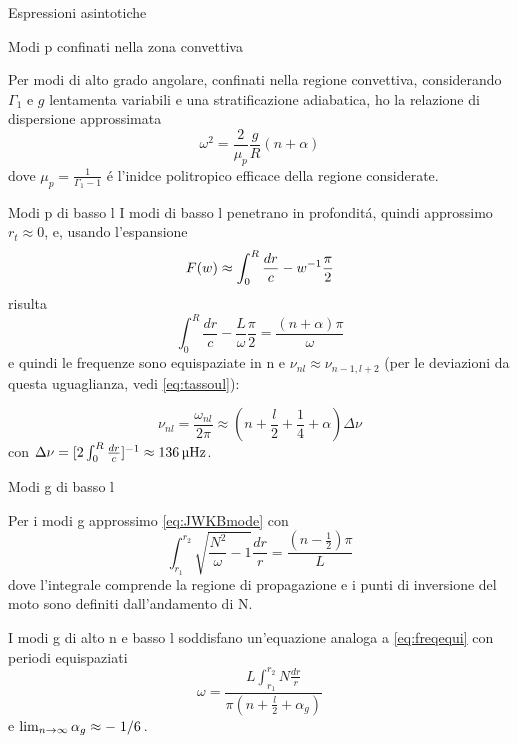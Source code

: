 \begin{frame}{Espressioni asintotiche}

\begin{block}{Modi p confinati nella zona convettiva}

Per modi di alto grado angolare, confinati nella regione convettiva, considerando $\Gamma_1$ e $g$ lentamenta variabili e una stratificazione adiabatica, ho la relazione di dispersione approssimata
\begin{equation}
\omega^2=\frac{2}{\mu_p}\frac{g}{R}(n+\alpha)
\end{equation}
dove $\mu_p=\frac{1}{\Gamma_1-1}$ \'e l'inidce politropico efficace della regione considerate.

\end{block}

\begin{block}{Modi p di basso l}
I modi di basso l penetrano in profondit\'a, quindi approssimo $r_t\approx0$, e, usando l'espansione
\begin{equation}
F(w)\approx\int_0^R\frac{dr}{c}-w^{-1}\frac{\pi}{2}\label{eq:Flinear}
\end{equation}
 risulta
\begin{equation}
\int_0^R\frac{dr}{c}-\frac{L}{\omega}\frac{\pi}{2}=\frac{(n+\alpha)\pi}{\omega}
\end{equation}
e quindi le  frequenze sono equispaziate in n e $\nu_{nl}\approx\nu_{n-1,l+2}$ (per le deviazioni da questa uguaglianza, vedi \eqref{eq:tassoul}):

\begin{equation}
\nu_{nl}=\frac{\omega_{nl}}{2\pi}\approx(n+\frac{l}{2}+\frac{1}{4}+\alpha)\Delta\nu\label{eq:freqequi}
\end{equation}
con $\Delta\nu=[2\int_0^R\frac{dr}{c}]^{-1}\approx\SI{136}{\micro\hertz}$.

\end{block}

\begin{block}{Modi g di basso l}

Per i modi g approssimo \eqref{eq:JWKBmode} con
\begin{equation}
\int_{r_1}^{r_2}\sqrt{\frac{N^2}{\omega}-1}\frac{dr}{r}=\frac{(n-\frac{1}{2})\pi}{L}
\end{equation}
dove l'integrale comprende la regione di propagazione e i punti di inversione del moto sono definiti dall'andamento di N.

I modi g di alto n e basso l soddisfano un'equazione analoga a \eqref{eq:freqequi} con periodi equispaziati
\begin{equation}
\omega=\frac{L\int_{r_1}^{r_2}N\frac{dr}{r}}{\pi(n+\frac{l}{2}+\alpha_g)}
\end{equation}
e $\lim_{n\to\infty}{\alpha_g}\approx-\left.{1}\middle/{6}\right.$.

\end{block}

\end{frame}